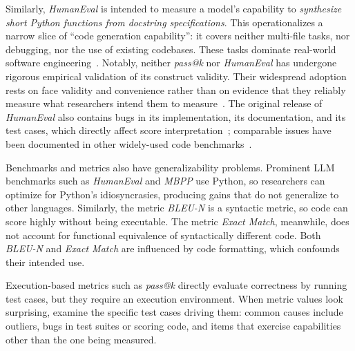 \documentclass[smallextended]{svjour3}
\begin{document}
Similarly, \emph{HumanEval} is intended to measure a model's capability to \textit{synthesize short Python functions from docstring specifications}. This operationalizes a narrow slice of ``code generation capability'': it covers neither multi-file tasks, nor debugging, nor the use of existing codebases. These tasks dominate real-world software engineering~\cite{Chandra2025benchmarks}. Notably, neither \emph{pass@k} nor \emph{HumanEval} has undergone rigorous empirical validation of its construct validity. Their widespread adoption rests on face validity and convenience rather than on evidence that they reliably measure what researchers intend them to measure~\cite{cao2025should}. The original release of \emph{HumanEval} also contains bugs in its implementation, its documentation, and its test cases, which directly affect score interpretation~\cite{DBLP:conf/nips/LiuXW023}; comparable issues have been documented in other widely-used code benchmarks~\cite{cao2025should}.

Benchmarks and metrics also have generalizability problems. Prominent LLM benchmarks such as \emph{HumanEval} and \emph{MBPP} use Python, so researchers can optimize for Python's idiosyncrasies, producing gains that do not generalize to other languages. Similarly, the metric \emph{BLEU-N} is a syntactic metric, so code can score highly without being executable. The metric \emph{Exact Match}, meanwhile, does not account for functional equivalence of syntactically different code. Both \emph{BLEU-N} and \emph{Exact Match} are influenced by code formatting, which confounds their intended use.

Execution-based metrics such as \emph{pass@k} directly evaluate correctness by running test cases, but they require an execution environment.
When metric values look surprising, examine the specific test cases driving them: common causes include outliers, bugs in test suites or scoring code, and items that exercise capabilities other than the one being measured.
\end{document}
